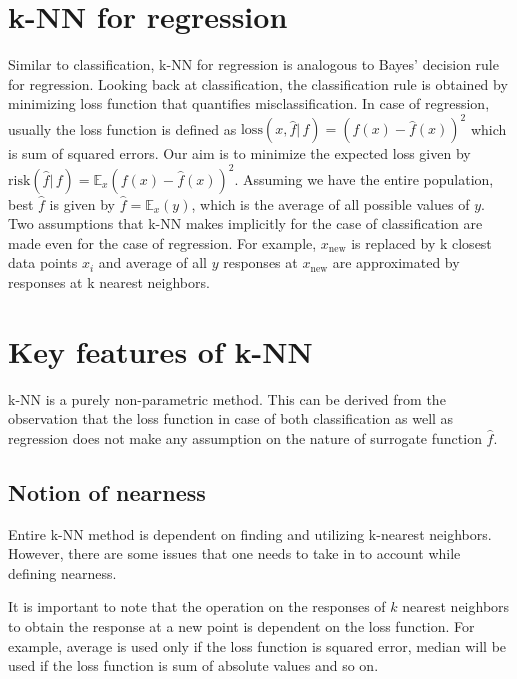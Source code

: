 \documentclass{article}
\begin{document}
\section{k-NN for regression}
Similar to classification, k-NN for regression is analogous to Bayes' decision rule for regression. Looking back at classification, the classification rule is obtained by minimizing loss function that quantifies misclassification. In case of regression, usually the loss function is defined as $\mathrm{loss}(x, \hat{f}|\,f) = (f(x) - \hat{f}(x))^2$ which is sum of squared errors. Our aim is to minimize the expected loss given by $\mathrm{risk}(\hat{f}|\,f) = \mathbb{E}_x(f(x) - \hat{f}(x))^2$. Assuming we have the entire population, best $\hat{f}$ is given by $\hat{f} = \mathbb{E}_x(y)$, which is the average of all possible values of $y$.
Two assumptions that k-NN makes implicitly for the case of classification are made even for the case of regression. For example, $x_{\mathrm{new}}$ is replaced by k closest data points $x_i$ and average of all $y$ responses at $x_{\mathrm{new}}$ are approximated by responses at k nearest neighbors.

\section{Key features of k-NN}
k-NN is a purely non-parametric method. This can be derived from the observation that the loss function in case of both classification as well as regression does not make any assumption on the nature of surrogate function $\hat{f}$.

\subsection{Notion of nearness}
Entire k-NN method is dependent on finding and utilizing k-nearest neighbors. However, there are some issues that one needs to take in to account while defining nearness. 

It is important to note that the operation on the responses of $k$ nearest neighbors to obtain the response at a new point is dependent on the loss function. For example, average is used only if the loss function is squared error, median will be used if the loss function is sum of absolute values and so on.
\end{document}
